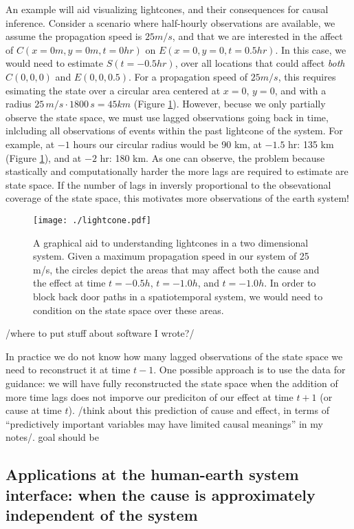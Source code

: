 \documentclass[12pt]{article}
\begin{document}
An example will aid visualizing lightcones, and their consequences for
causal inference. Consider a scenario where half-hourly observations
are available, we assume the propagation speed is $25 m/s$, and that
we are interested in the affect of $C(x=0 m, y=0 m, t=0 hr)$ on
$E(x=0, y=0, t=0.5 hr)$. In this case, we would need to estimate
$S(t=-0.5 hr)$, over all locations that could affect \emph{both}
$C(0,0,0)$ and $E(0,0,0.5)$.  For a propagation speed of $25 m/s$,
this requires esimating the state over a circular area centered at
$x=0$, $y=0$, and with a radius $25 \, m/s \cdot 1800 \, s = 45 km$
(Figure \ref{fig:lightcone}). However, becuse we only partially
observe the state space, we must use lagged observations going back in
time, inlcluding all observations of events within the past lightcone
of the system. For example, at $-1$ hours our circular radius would be
90 km, at $-1.5$ hr: 135 km (Figure \ref{fig:lightcone}), and at $-2$
hr: 180 km. As one can observe, the problem because stastically and
computationally harder the more lags are required to estimate are
state space. If the number of lags in inversly proportional to the
obsevational coverage of the state space, this motivates more
observations of the earth system!

\begin{figure}
  \texttt{[image: ./lightcone.pdf]}
  \caption{A graphical aid to understanding lightcones in a two
    dimensional system. Given a maximum propagation speed in our
    system of 25 m/s, the circles depict the areas that may affect
    both the cause and the effect at time $t=-0.5 h$, $t=-1.0 h$, and
    $t=-1.0 h$. In order to block back door paths in a spatiotemporal
    system, we would need to condition on the state space over these
    areas.}
  \label{fig:lightcone}
\end{figure}


/where to put stuff about software I wrote?/

In practice we do not know how many lagged observations of the state
space we need to reconstruct it at time $t-1$. One possible approach
is to use the data for guidance: we will have fully reconstructed the
state space when the addition of more time lags does not imporve our
prediciton of our effect at time \(t+1\) (or cause at time
$t$). /think about this prediction of cause and effect, in terms of
``predictively important variables may have limited causal meanings''
in my notes/. goal should be


\subsection{Applications at the human-earth system interface: when the
cause is approximately independent of the system}
\label{human}
\end{document}
